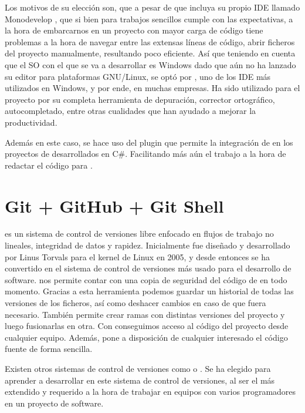 Los motivos de su elección son, que a pesar de que  incluya su propio IDE llamado Monodevelop , que si bien para trabajos sencillos cumple con las expectativas, a la hora de embarcarnos en un proyecto con mayor carga de código tiene problemas a la hora de navegar entre las extensas líneas de código, abrir ficheros del proyecto manualmente, resultando poco eficiente. Así que teniendo en cuenta que el SO con el que se va a desarrollar es Windows dado que  aún no ha lanzado su editor para plataformas GNU/Linux, se optó por , uno de los IDE más utilizados en Windows, y por ende, en muchas empresas. Ha sido utilizado para el proyecto por su completa herramienta de depuración, corrector ortográfico, autocompletado, entre otras cualidades que han ayudado a mejorar la productividad.

Además en este caso, se hace uso del plugin   que permite la integración de  en los proyectos de  desarrollados en C\#. Facilitando más aún el trabajo a la hora de redactar el código para \nombrejuego.

\section*{Git + GitHub + Git Shell}
  es un sistema de control de versiones libre enfocado en flujos de trabajo no lineales, integridad de datos y rapidez. Inicialmente fue diseñado y desarrollado por Linus Torvals para el kernel de Linux en 2005, y desde entonces se ha convertido en el sistema de control de versiones más usado para el desarrollo de software.  nos permite contar con una copia de seguridad del código de \nombrejuego en todo momento. Gracias a esta herramienta podemos guardar un historial de todas las versiones de los ficheros, así como deshacer cambios en caso de que fuera necesario. También permite crear ramas con distintas versiones del proyecto y luego fusionarlas en otra. Con  conseguimos acceso al código del proyecto desde cualquier equipo. Además, pone a disposición de cualquier interesado el código fuente de forma sencilla.

Existen otros sistemas de control de versiones como  o . Se ha elegido  para aprender a desarrollar en este sistema de control de versiones, al ser el más extendido y requerido a la hora de trabajar en equipos con varios programadores en un proyecto de software. 

